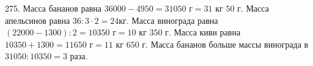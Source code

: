 275. Масса бананов равна $36000-4950=31050\text{ г}=31\text{ кг }50\text{ г}.$ Масса апельсинов равна $36:3\cdot2=24$кг. Масса винограда равна $(22000-1300):2=10350\text{ г}=10\text{ кг }350\text{ г}.$ Масса киви равна $10350+1300=11650\text{ г}=11\text{ кг }650\text{ г}.$ Масса бананов больше массы винограда в $31050:10350=3$ раза.\\
